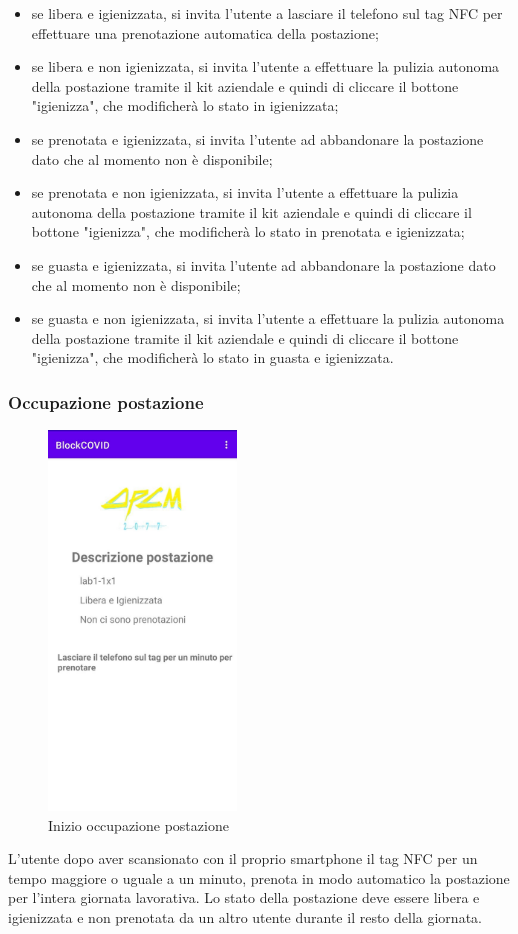 	\begin{itemize}
		\item se libera e igienizzata, si invita l'utente a lasciare il telefono sul tag NFC per effettuare una prenotazione automatica della postazione;
		\item se libera e non igienizzata, si invita l'utente a effettuare la pulizia autonoma della postazione tramite il kit aziendale e quindi di cliccare il bottone "igienizza", che modificherà lo stato in igienizzata;
		\item se prenotata e igienizzata, si invita l'utente ad abbandonare la postazione dato che al momento non è disponibile;
		\item se prenotata e non igienizzata, si invita l'utente a effettuare la pulizia autonoma della postazione tramite il kit aziendale e quindi di cliccare il bottone "igienizza", che modificherà lo stato in prenotata e igienizzata;
		\item se guasta e igienizzata, si invita l'utente ad abbandonare la postazione dato che al momento non è disponibile;
		\item se guasta e non igienizzata, si invita l'utente a effettuare la pulizia autonoma della postazione tramite il kit aziendale e quindi di cliccare il bottone "igienizza", che modificherà lo stato in guasta e igienizzata.
	\end{itemize}
	
	\subsubsection{Occupazione postazione}
	\begin{figure}[H]
		\centering
		\includegraphics[width=5cm]{res/images/DescrizionePostazione1.png}
		\caption{Inizio occupazione postazione}
	\end{figure}
	L'utente dopo aver scansionato con il proprio smartphone il tag NFC per un tempo maggiore o uguale a un minuto, prenota in modo automatico la postazione per
	l’intera giornata lavorativa. Lo stato della postazione deve essere libera e igienizzata e non prenotata da un altro utente durante il resto della giornata.
